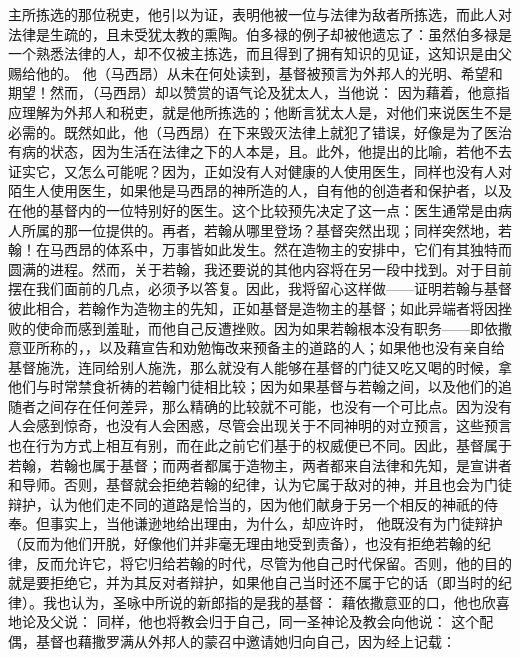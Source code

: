 主所拣选的那位税吏，他引以为证，表明他被一位与法律为敌者所拣选，而此人对法律是生疏的，且未受犹太教的熏陶。伯多禄的例子却被他遗忘了：虽然伯多禄是一个熟悉法律的人，却不仅被主拣选，而且得到了拥有知识的见证，这知识是由父赐给他的。 他（马西昂）从未在何处读到，基督被预言为外邦人的光明、希望和期望！然而，（马西昂）却以赞赏的语气论及犹太人，当他说：  因为藉着，他意指应理解为外邦人和税吏，就是他所拣选的；他断言犹太人是，对他们来说医生不是必需的。既然如此，他（马西昂）在下来毁灭法律上就犯了错误，好像是为了医治有病的状态，因为生活在法律之下的人本是，且。此外，他提出的比喻，若他不去证实它，又怎么可能呢？因为，正如没有人对健康的人使用医生，同样也没有人对陌生人使用医生，如果他是马西昂的神所造的人，自有他的创造者和保护者，以及在他的基督内的一位特别好的医生。这个比较预先决定了这一点：医生通常是由病人所属的那一位提供的。再者，若翰从哪里登场？基督突然出现；同样突然地，若翰！在马西昂的体系中，万事皆如此发生。然在造物主的安排中，它们有其独特而圆满的进程。然而，关于若翰，我还要说的其他内容将在另一段中找到。对于目前摆在我们面前的几点，必须予以答复。因此，我将留心这样做——证明若翰与基督彼此相合，若翰作为造物主的先知，正如基督是造物主的基督；如此异端者将因挫败的使命而感到羞耻，而他自己反遭挫败。因为如果若翰根本没有职务——即依撒意亚所称的，，以及藉宣告和劝勉悔改来预备主的道路的人；如果他也没有亲自给基督施洗，连同给别人施洗，那么就没有人能够在基督的门徒又吃又喝的时候，拿他们与时常禁食祈祷的若翰门徒相比较；因为如果基督与若翰之间，以及他们的追随者之间存在任何差异，那么精确的比较就不可能，也没有一个可比点。因为没有人会感到惊奇，也没有人会困惑，尽管会出现关于不同神明的对立预言，这些预言也在行为方式上相互有别，而在此之前它们基于的权威便已不同。因此，基督属于若翰，若翰也属于基督；而两者都属于造物主，两者都来自法律和先知，是宣讲者和导师。否则，基督就会拒绝若翰的纪律，认为它属于敌对的神，并且也会为门徒辩护，认为他们走不同的道路是恰当的，因为他们献身于另一个相反的神祇的侍奉。但事实上，当他谦逊地给出理由，为什么，却应许时， 他既没有为门徒辩护（反而为他们开脱，好像他们并非毫无理由地受到责备），也没有拒绝若翰的纪律，反而允许它，将它归给若翰的时代，尽管为他自己时代保留。否则，他的目的就是要拒绝它，并为其反对者辩护，如果他自己当时还不属于它的话（即当时的纪律）。我也认为，圣咏中所说的新郎指的是我的基督： 藉依撒意亚的口，他也欣喜地论及父说：  同样，他也将教会归于自己，同一圣神论及教会向他说：  这个配偶，基督也藉撒罗满从外邦人的蒙召中邀请她归向自己，因为经上记载：  